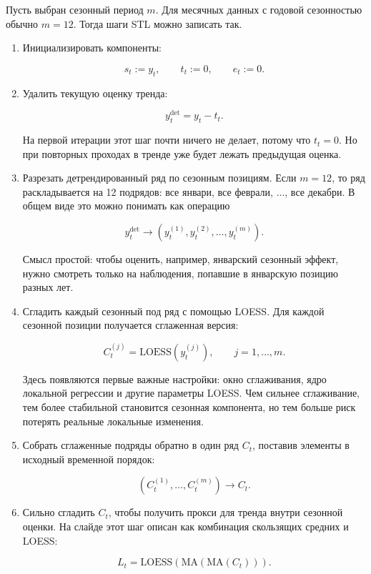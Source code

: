 \documentclass[12pt,fleqn]{article}
\begin{document}
Пусть выбран сезонный период \(m\).
Для месячных данных с годовой сезонностью обычно \(m=12\).
Тогда шаги STL можно записать так.

\begin{enumerate}
  \item Инициализировать компоненты:

\[
s_t := y_t,\qquad
t_t := 0,\qquad
e_t := 0.
\]

  \item Удалить текущую оценку тренда:

\[
y_t^{\mathrm{det}}
=
y_t-t_t.
\]

На первой итерации этот шаг почти ничего не делает, потому что \(t_t=0\).
Но при повторных проходах в тренде уже будет лежать предыдущая оценка.

  \item Разрезать детрендированный ряд по сезонным позициям.
  Если \(m=12\), то ряд раскладывается на 12 подрядов: все январи, все феврали, ..., все декабри.
  В общем виде это можно понимать как операцию

\[
y_t^{\mathrm{det}}
\longrightarrow
\left(y_t^{(1)},y_t^{(2)},\ldots,y_t^{(m)}\right).
\]

Смысл простой: чтобы оценить, например, январский сезонный эффект, нужно смотреть только на наблюдения, попавшие в январскую позицию разных лет.

  \item Сгладить каждый сезонный под ряд с помощью LOESS.
  Для каждой сезонной позиции получается сглаженная версия:

\[
C_t^{(j)}=\mathrm{LOESS}\left(y_t^{(j)}\right),
\qquad j=1,\ldots,m.
\]

Здесь появляются первые важные настройки: окно сглаживания, ядро локальной регрессии и другие параметры LOESS.
Чем сильнее сглаживание, тем более стабильной становится сезонная компонента, но тем больше риск потерять реальные локальные изменения.

  \item Собрать сглаженные подряды обратно в один ряд \(C_t\), поставив элементы в исходный временной порядок:

\[
\left(C_t^{(1)},\ldots,C_t^{(m)}\right)
\longrightarrow
C_t.
\]

  \item Сильно сгладить \(C_t\), чтобы получить прокси для тренда внутри сезонной оценки.
  На слайде этот шаг описан как комбинация скользящих средних и LOESS:

\[
L_t
=
\mathrm{LOESS}\left(
\mathrm{MA}\left(
\mathrm{MA}\left(C_t\right)
\right)
\right).
\]


\end{enumerate}
\end{document}
